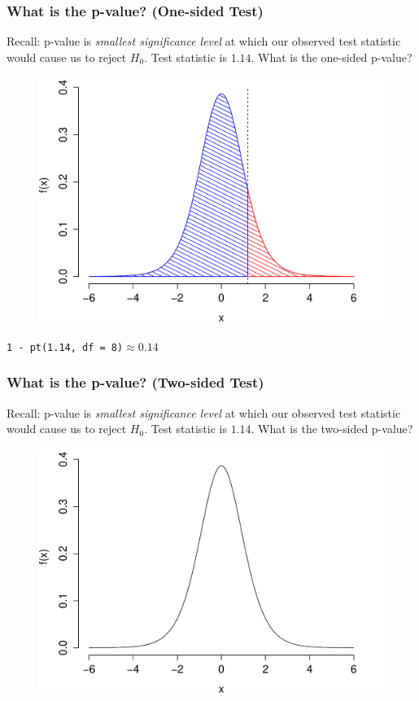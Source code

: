 \begin{frame}
\frametitle{What is the p-value? (One-sided Test)}
\footnotesize
Recall: p-value is \emph{smallest significance level} at which our observed test statistic would cause us to reject $H_0$. \alert{Test statistic is $1.14$. What is the one-sided p-value? }
\begin{figure}
\includegraphics[scale= 0.4]{./images/p_upper4}

\end{figure}
\texttt{1 - pt(1.14, df = 8)}$\approx 0.14$
\end{frame}

\begin{frame}
\frametitle{What is the p-value? (Two-sided Test)}
\footnotesize
Recall: p-value is \emph{smallest significance level} at which our observed test statistic would cause us to reject $H_0$. \alert{Test statistic is $1.14$. What is the two-sided p-value? }
\begin{figure}
\includegraphics[scale= 0.4]{./images/p_both1}

\end{figure}

\end{frame}

